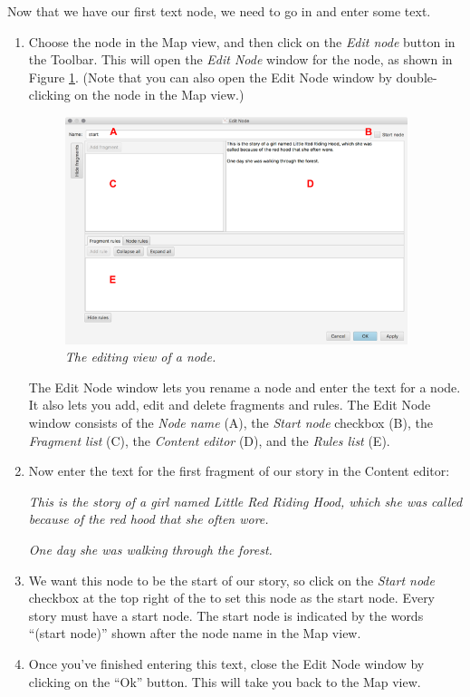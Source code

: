 \documentclass{article}
\begin{document}
Now that we have our first text node, we need to go in and enter some text.

\begin{enumerate}
  \item Choose the node in the Map view, and then click on the \textit{Edit node} button in the Toolbar. This will open the \textit{Edit Node} window for the node, as shown in Figure \ref{fig:tut1:edit_node}. (Note that you can also open the Edit Node window by double-clicking on the node in the Map view.)
  
\begin{figure}[ht]
  \centering
  \includegraphics[width=10cm]{images/hypedyn-tutorial-1-figure-5}
  \caption{\textit{The editing view of a node.}}
  \label{fig:tut1:edit_node}
\end{figure} 

The Edit Node window lets you rename a node and enter the text for a node. It also lets you add, edit and delete fragments and rules. The Edit Node window consists of the \textit{Node name} (A), the \textit{Start node} checkbox (B), the \textit{Fragment list} (C), the \textit{Content editor} (D), and the \textit{Rules list} (E).

\item Now enter the text for the first fragment of our story in the Content editor:

\textit{This is the story of a girl named Little Red Riding Hood, which she was called because of the red hood that she often wore.}

\textit{One day she was walking through the forest.}

\item We want this node to be the start of our story, so click on the \textit{Start node} checkbox at the top right of the  to set this node as the start node. Every story must have a start node. The start node is indicated by the words ``(start node)'' shown after the node name in the Map view. %
\item Once you've finished entering this text, close the Edit Node window by clicking on the ``Ok'' button. This will take you back to the Map view.
\end{enumerate}
\end{document}
